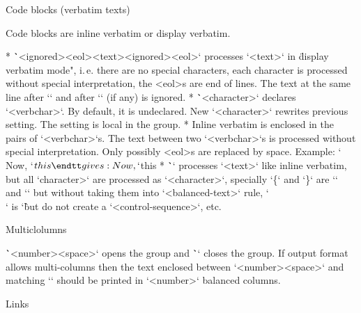 \secc Code blocks (verbatim texts)

Code blocks are inline verbatim or display verbatim.

\begitems
* \.`\begtt <ignored><eol><text>\endtt<ignored><eol>` processes `<text>` in
  \"display verbatim mode", i.\,e. there are no special characters, each character
  is processed without special interpretation, the <eol>s are end of lines.
  The text at the same line after `\begtt` and after `\endtt` (if any) is
  ignored.
* \.`\verbchar <character>` declares `<verbchar>`. By default, it is undeclared.\nl
  New `\verbchar <character>` rewrites previous setting. The setting is
  local in the group.
* Inline verbatim is enclosed in the pairs of `<verbchar>`s.
  The text between two `<verbchar>`s is processed without special interpretation.
  Only possibly <eol>s are replaced by space.
  Example:
  \begtt
  \verbchar`
  Now, `$this %text   ~\` is processed as inline verbatim.
  \endtt
  gives: Now, `$this %
* \.`` processes `<text>` like inline verbatim, but
  all `\<character>` are processed as `<character>`, specially `\{` and `\}`
  are `{` and `}` but without taking them into `<balanced-text>` rule,
  `\\` is `\` but do not create a `<control-sequence>`, etc.
\enditems


\secc Multiclolumns

\.`\begmulti <number><space>` opens the group and \.`\endmulti`
closes the group. If output format allows multi-columns then
the text enclosed between `\begmulti <number><space>` and matching
`\endmulti` should be printed in `<number>` balanced columns.


\secc Links

